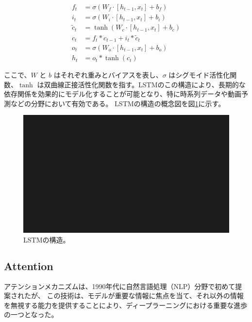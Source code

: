     \begin{align}
      f_t &= \sigma(W_f \cdot [h_{t-1}, x_t] + b_f) \\
      i_t &= \sigma(W_i \cdot [h_{t-1}, x_t] + b_i) \\
      \tilde{c}_t &= \tanh(W_c \cdot [h_{t-1}, x_t] + b_c) \\
      c_t &= f_t * c_{t-1} + i_t * \tilde{c}_t \\
      o_t &= \sigma(W_o \cdot [h_{t-1}, x_t] + b_o) \\
      h_t &= o_t * \tanh(c_t)
    \end{align}
    
    ここで、\( W \) と \( b \) はそれぞれ重みとバイアスを表し、\( \sigma \) はシグモイド活性化関数、\( \tanh \) は双曲線正接活性化関数を指す。LSTMのこの構造により、長期的な依存関係を効果的にモデル化することが可能となり、特に時系列データや動画予測などの分野において有効である。
    LSTMの構造の概念図を図\ref{fig:lstm}に示す。
    \begin{figure}[h]
      \centering
      \includegraphics[width=\textwidth]{figures/sample.png}
      \caption{LSTMの構造。}
      \label{fig:lstm}
    \end{figure}
    
    \subsection{Attention}
    アテンションメカニズムは、1990年代に自然言語処理（NLP）分野で初めて提案されたが、
    この技術は、モデルが重要な情報に焦点を当て、それ以外の情報を無視する能力を提供することにより、ディープラーニングにおける重要な進歩の一つとなった。


